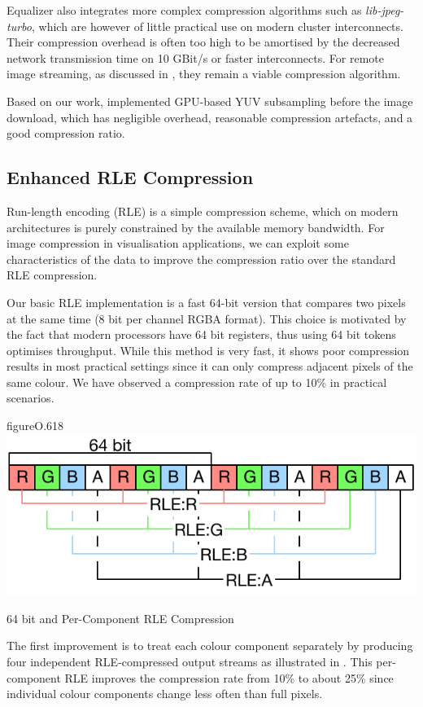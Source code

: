 Equalizer also integrates more complex compression algorithms such as {\em
lib-jpeg-turbo}, which are however of little practical use on modern cluster
interconnects. Their compression overhead is often too high to be amortised by
the decreased network transmission time on 10 GBit/s or faster interconnects.
For remote image streaming, as discussed in , they remain a
viable compression algorithm.

Based on our work, \cite{MEP:10} implemented GPU-based YUV subsampling before
the image download, which has negligible overhead, reasonable compression
artefacts, and a good compression ratio.

\subsection{Enhanced RLE Compression}

Run-length encoding (RLE) is a simple compression scheme, which on modern
architectures is purely constrained by the available memory bandwidth. For image
compression in visualisation applications, we can exploit some characteristics
of the data to improve the compression ratio over the standard RLE compression.

Our basic RLE implementation is a fast 64-bit version that compares two pixels
at the same time (8 bit per channel RGBA format). This choice is motivated by
the fact that modern processors have 64 bit registers, thus using 64 bit tokens
optimises throughput. While this method is very fast, it shows poor compression
results in most practical settings since it can only compress adjacent pixels
of the same colour. We have observed a compression rate of up to 10\% in
practical scenarios.

\begin{wrapfloat}{figure}{O}{.618\textwidth}
  \includegraphics[width=.618\textwidth]{images/RLE}
  \caption{64 bit and Per-Component RLE Compression}
  \label{fRLE}
\end{wrapfloat}

The first improvement is to treat each colour component separately by producing
four independent RLE-compressed output streams as illustrated in .
This per-component RLE improves the compression rate from 10\% to about 25\%
since individual colour components change less often than full pixels.

